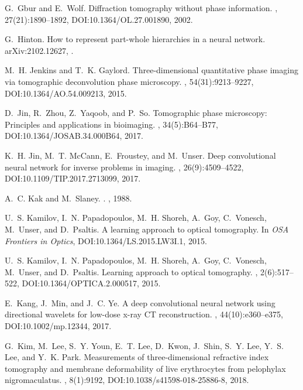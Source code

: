 \documentclass[11pt]{article}
\theoremstyle{plain} %
\begin{document}
\begin{thebibliography}{10}
G.~Gbur and E.~Wolf.
\newblock Diffraction tomography without phase information.
, 27(21):1890--1892,
\newblock DOI:10.1364/OL.27.001890,
2002.

G.~Hinton.
\newblock How to represent part-whole hierarchies in a neural network.
\newblock arXiv:2102.12627,
.

M.~H. Jenkins and T.~K. Gaylord.
\newblock Three-dimensional quantitative phase imaging via tomographic deconvolution phase microscopy.
, 54(31):9213--9227,
\newblock DOI:10.1364/AO.54.009213,
2015.

D.~Jin, R.~Zhou, Z.~Yaqoob, and P.~So.
\newblock Tomographic phase microscopy: {P}rinciples and applications in bioimaging.
, 34(5):B64--B77,
\newblock DOI:10.1364/JOSAB.34.000B64,
2017.

K.~H. {Jin}, M.~T. {McCann}, E.~{Froustey}, and M.~{Unser}.
\newblock Deep convolutional neural network for inverse problems in imaging.
, 26(9):4509--4522,
\newblock DOI:10.1109/TIP.2017.2713099,
2017.

A.~C. Kak and M.~Slaney.
.
, 1988.

U.~S. Kamilov, I.~N. Papadopoulos, M.~H. Shoreh, A.~Goy, C.~Vonesch, M.~Unser, and D.~Psaltis.
\newblock A learning approach to optical tomography.
\newblock In {\em OSA Frontiers in Optics},
\newblock DOI:10.1364/LS.2015.LW3I.1,
2015.

U.~S. Kamilov, I.~N. Papadopoulos, M.~H. Shoreh, A.~Goy, C.~Vonesch, M.~Unser, and D.~Psaltis.
\newblock Learning approach to optical tomography.
, 2(6):517--522,
\newblock DOI:10.1364/OPTICA.2.000517,
2015.

E.~Kang, J.~Min, and J.~C. Ye.
\newblock A deep convolutional neural network using directional wavelets for low-dose x-ray {CT} reconstruction.
, 44(10):e360--e375,
\newblock DOI:10.1002/mp.12344,
2017.

G.~Kim, M.~Lee, S.~Y. Youn, E.~T. Lee, D.~Kwon, J.~Shin, S.~Y. Lee, Y.~S. Lee, and Y.~K. Park.
\newblock Measurements of three-dimensional refractive index tomography and membrane deformability of live erythrocytes from pelophylax nigromaculatus.
, 8(1):9192,
\newblock DOI:10.1038/s41598-018-25886-8,
2018.


\end{thebibliography}
\end{document}
